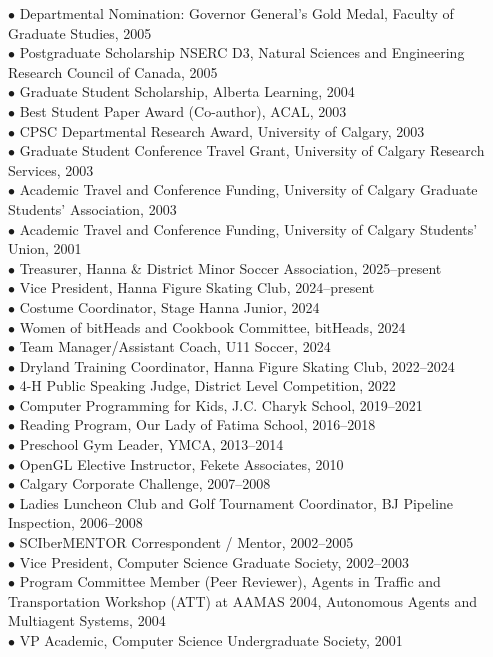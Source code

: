 \documentclass[9pt]{developercv}
\begin{document}
$\bullet$ Departmental Nomination: Governor General's Gold Medal, Faculty of Graduate Studies, 2005\\
$\bullet$ Postgraduate Scholarship NSERC D3, Natural Sciences and Engineering Research Council of Canada, 2005\\
$\bullet$ Graduate Student Scholarship, Alberta Learning, 2004\\
$\bullet$ Best Student Paper Award (Co-author), ACAL, 2003\\
$\bullet$ CPSC Departmental Research Award, University of Calgary, 2003\\
$\bullet$ Graduate Student Conference Travel Grant, University of Calgary Research Services, 2003\\
$\bullet$ Academic Travel and Conference Funding, University of Calgary Graduate Students' Association, 2003\\
$\bullet$ Academic Travel and Conference Funding, University of Calgary Students' Union, 2001\\

$\bullet$ Treasurer, Hanna \& District Minor Soccer Association, 2025--present\\
$\bullet$ Vice President, Hanna Figure Skating Club, 2024--present\\
$\bullet$ Costume Coordinator, Stage Hanna Junior, 2024\\
$\bullet$ Women of bitHeads and Cookbook Committee, bitHeads, 2024\\
$\bullet$ Team Manager/Assistant Coach, U11 Soccer, 2024\\
$\bullet$ Dryland Training Coordinator, Hanna Figure Skating Club, 2022--2024\\
$\bullet$ 4-H Public Speaking Judge, District Level Competition, 2022\\
$\bullet$ Computer Programming for Kids, J.C. Charyk School, 2019--2021\\
$\bullet$ Reading Program, Our Lady of Fatima School, 2016--2018\\
$\bullet$ Preschool Gym Leader, YMCA, 2013--2014\\
$\bullet$ OpenGL Elective Instructor, Fekete Associates, 2010\\
$\bullet$ Calgary Corporate Challenge, 2007--2008\\
$\bullet$ Ladies Luncheon Club and Golf Tournament Coordinator, BJ Pipeline Inspection, 2006--2008\\
$\bullet$ SCIberMENTOR Correspondent / Mentor, 2002--2005\\
$\bullet$ Vice President, Computer Science Graduate Society, 2002--2003\\
$\bullet$ Program Committee Member (Peer Reviewer), Agents in Traffic and Transportation Workshop (ATT) at AAMAS 2004, Autonomous Agents and Multiagent Systems, 2004\\
$\bullet$ VP Academic, Computer Science Undergraduate Society, 2001\\
\end{document}
